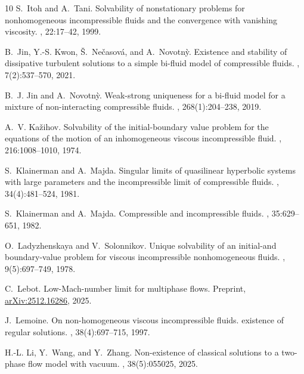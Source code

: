 \documentclass[11pt, twoside, a4paper]{article}
\theoremstyle{plain}
\theoremstyle{remark}
\numberwithin{equation}{section}
\begin{document}
\begin{thebibliography}{10}
S.~Itoh and A.~Tani.
\newblock Solvability of nonstationary problems for nonhomogeneous
  incompressible fluids and the convergence with vanishing viscosity.
, 22:17--42, 1999.

B.~Jin, Y.-S. Kwon, {\v{S}}.~Ne{\v{c}}asov{\'a}, and A.~Novotn{\`y}.
\newblock Existence and stability of dissipative turbulent solutions to a
  simple bi-fluid model of compressible fluids.
, 7(2):537--570, 2021.

B.~J. Jin and A.~Novotn{\`y}.
\newblock Weak-strong uniqueness for a bi-fluid model for a mixture of
  non-interacting compressible fluids.
, 268(1):204--238, 2019.

A.~V. Ka\v{z}ihov.
\newblock Solvability of the initial-boundary value problem for the equations
  of the motion of an inhomogeneous viscous incompressible fluid.
, 216:1008--1010, 1974.

S.~Klainerman and A.~Majda.
\newblock Singular limits of quasilinear hyperbolic systems with large
  parameters and the incompressible limit of compressible fluids.
, 34(4):481--524, 1981.

S.~Klainerman and A.~Majda.
\newblock Compressible and incompressible fluids.
, 35:629--651, 1982.

O.~Ladyzhenskaya and V.~Solonnikov.
\newblock Unique solvability of an initial-and boundary-value problem for
  viscous incompressible nonhomogeneous fluids.
, 9(5):697--749, 1978.

C.~Lebot.
\newblock Low-{M}ach-number limit for multiphase flows.
\newblock Preprint, \href{https://arxiv.org/abs/2512.16286}{arXiv:2512.16286},
  2025.

J.~Lemoine.
\newblock On non-homogeneous viscous incompressible fluids. existence of
  regular solutions.
, 38(4):697--715, 1997.

H.-L. Li, Y.~Wang, and Y.~Zhang.
\newblock Non-existence of classical solutions to a two-phase flow model with
  vacuum.
, 38(5):055025, 2025.


\end{thebibliography}
\end{document}
